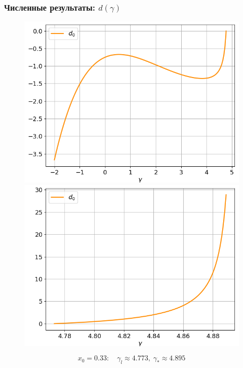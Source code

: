 \documentclass[fullscreen=true, unicode, bookmarks=false]{beamer}
\begin{document}
\begin{frame}
\frametitle{ Численные результаты: $ d(\gamma) $ }

\begin{figure} 
\includegraphics[scale=0.37]{divergent_d0_before_13.png}  
\hfill
\includegraphics[scale=0.37]{divergent_d0_after_13.png}  
\end{figure}

$$ x_0 = 0.33: \quad \gamma_l \approx 4.773, \; \gamma_* \approx 4.895 $$

\end{frame}
\end{document}
